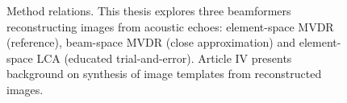 {%
% 
% 
% 
% 

\begin{figure}[tp]
\caption{Method relations. This thesis explores three beamformers reconstructing images from acoustic echoes: element-space MVDR (reference), beam-space MVDR (close approximation) and element-space LCA (educated trial-and-error). Article IV presents background on synthesis of image templates from reconstructed images. }%
\label{2_fig_article_relation}
\end{figure}

}
